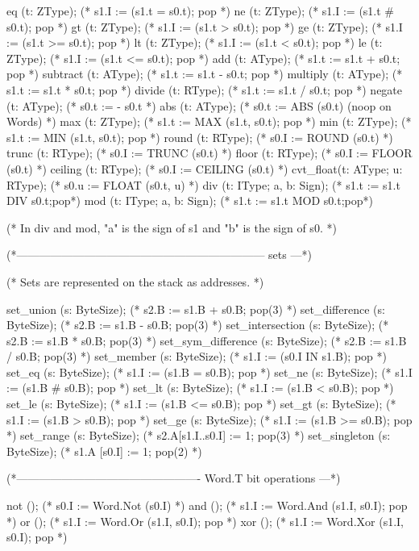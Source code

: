 {eq       (t: ZType);   (* s1.I := (s1.t = s0.t); pop *)
ne       (t: ZType);   (* s1.I := (s1.t # s0.t); pop *)
gt       (t: ZType);   (* s1.I := (s1.t > s0.t); pop *)
ge       (t: ZType);   (* s1.I := (s1.t >= s0.t); pop *)
lt       (t: ZType);   (* s1.I := (s1.t < s0.t); pop *)
le       (t: ZType);   (* s1.I := (s1.t <= s0.t); pop *)
add      (t: AType);   (* s1.t := s1.t + s0.t; pop *)
subtract (t: AType);   (* s1.t := s1.t - s0.t; pop *)
multiply (t: AType);   (* s1.t := s1.t * s0.t; pop *)
divide   (t: RType);   (* s1.t := s1.t / s0.t; pop *)
negate   (t: AType);   (* s0.t := - s0.t *)
abs      (t: AType);   (* s0.t := ABS (s0.t) (noop on Words) *)
max      (t: ZType);   (* s1.t := MAX (s1.t, s0.t); pop *)
min      (t: ZType);   (* s1.t := MIN (s1.t, s0.t); pop *)
round    (t: RType);   (* s0.I := ROUND (s0.t) *)
trunc    (t: RType);   (* s0.I := TRUNC (s0.t) *)
floor    (t: RType);   (* s0.I := FLOOR (s0.t) *)
ceiling  (t: RType);   (* s0.I := CEILING (s0.t) *)
cvt_float(t: AType;  u: RType);     (* s0.u := FLOAT (s0.t, u) *)
div      (t: IType;  a, b: Sign);   (* s1.t := s1.t DIV s0.t;pop*)
mod      (t: IType;  a, b: Sign);   (* s1.t := s1.t MOD s0.t;pop*)

(* In div and mod, "a" is the sign of s1 and "b" is the sign of s0. *)

(*------------------------------------------------------------------ sets ---*)

(* Sets are represented on the stack as addresses. *)

set_union (s: ByteSize);          (* s2.B := s1.B + s0.B; pop(3) *)
set_difference (s: ByteSize);     (* s2.B := s1.B - s0.B; pop(3) *)
set_intersection (s: ByteSize);   (* s2.B := s1.B * s0.B; pop(3) *)
set_sym_difference (s: ByteSize); (* s2.B := s1.B / s0.B; pop(3) *)
set_member (s: ByteSize);         (* s1.I := (s0.I IN s1.B); pop *)
set_eq (s: ByteSize);             (* s1.I := (s1.B = s0.B); pop *)
set_ne (s: ByteSize);             (* s1.I := (s1.B # s0.B); pop *)
set_lt (s: ByteSize);             (* s1.I := (s1.B < s0.B); pop *)
set_le (s: ByteSize);             (* s1.I := (s1.B <= s0.B); pop *)
set_gt (s: ByteSize);             (* s1.I := (s1.B > s0.B); pop *)
set_ge (s: ByteSize);             (* s1.I := (s1.B >= s0.B); pop *)
set_range (s: ByteSize);          (* s2.A[s1.I..s0.I] := 1; pop(3) *)
set_singleton (s: ByteSize);      (* s1.A [s0.I] := 1; pop(2) *)

(*------------------------------------------------- Word.T bit operations ---*)

not ();  (* s0.I := Word.Not (s0.I) *)
and ();  (* s1.I := Word.And (s1.I, s0.I); pop *)
or  ();  (* s1.I := Word.Or  (s1.I, s0.I); pop *)
xor ();  (* s1.I := Word.Xor (s1.I, s0.I); pop *)

}
